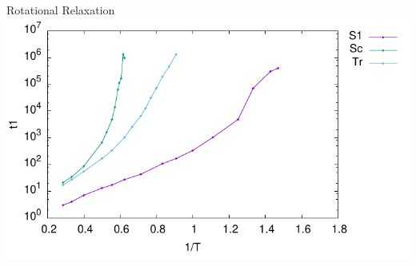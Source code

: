 \documentclass[16pt, aspectratio=43,compress]{beamer}
\begin{document}
\begin{frame}{Rotational Relaxation}
    \centering
    \includegraphics[width=\textwidth]{t1}
\end{frame}
\end{document}
